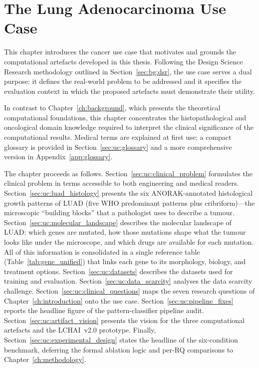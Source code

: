 
\chapter{The Lung Adenocarcinoma Use Case}
\label{ch:usecase}

This chapter introduces the cancer use case that motivates and grounds the computational artefacts developed in this thesis.
Following the Design Science Research methodology outlined in Section~\ref{sec:bg:dsr}, the use case serves a dual purpose: it defines the real-world problem to be addressed and it specifies the evaluation context in which the proposed artefacts must demonstrate their utility.

In contrast to Chapter~\ref{ch:background}, which presents the theoretical computational foundations, this chapter concentrates the histopathological and oncological domain knowledge required to interpret the clinical significance of the computational results.
Medical terms are explained at first use; a compact glossary is provided in Section~\ref{sec:uc:glossary} and a more comprehensive version in Appendix~\ref{app:glossary}.

The chapter proceeds as follows.
Section~\ref{sec:uc:clinical_problem} formulates the clinical problem in terms accessible to both engineering and medical readers.
Section~\ref{sec:uc:luad_histology} presents the six ANORAK-annotated histological growth patterns of LUAD (five WHO predominant patterns plus cribriform)---the microscopic ``building blocks'' that a pathologist uses to describe a tumour.
Section~\ref{sec:uc:molecular_landscape} describes the molecular landscape of LUAD: which genes are mutated, how those mutations shape what the tumour looks like under the microscope, and which drugs are available for each mutation.
All of this information is consolidated in a single reference table (Table~\ref{tab:gene_unified}) that links each gene to its morphology, biology, and treatment options.
Section~\ref{sec:uc:datasets} describes the datasets used for training and evaluation.
Section~\ref{sec:uc:data_scarcity} analyses the data scarcity challenge.
Section~\ref{sec:uc:clinical_questions} maps the seven research questions of Chapter~\ref{ch:introduction} onto the use case.
Section~\ref{sec:uc:pipeline_fixes} reports the headline figure of the pattern-classifier pipeline audit.
Section~\ref{sec:uc:artifact_vision} presents the vision for the three computational artefacts and the LCHAI~v2.0 prototype.
Finally, Section~\ref{sec:uc:experimental_design} states the headline of the six-condition benchmark, deferring the formal ablation logic and per-RQ comparisons to Chapter~\ref{ch:methodology}.


